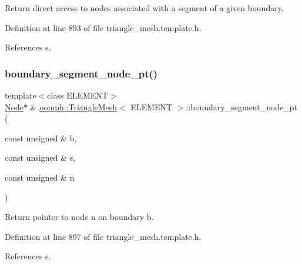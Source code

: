 Return direct access to nodes associated with a segment of a given boundary. 



Definition at line 893 of file triangle\+\_\+mesh.\+template.\+h.



References s.

\mbox{\label{classoomph_1_1TriangleMesh_ad7acd0ef2644130b830eed3cd3a9a259}} 
\subsubsection{\texorpdfstring{boundary\+\_\+segment\+\_\+node\+\_\+pt()}{boundary\_segment\_node\_pt()}\hspace{0.1cm}{\footnotesize\ttfamily [3/3]}}
{\footnotesize\ttfamily template$<$class E\+L\+E\+M\+E\+NT$>$ \\
\hyperlink{classoomph_1_1Node}{Node}$\ast$ \& \hyperlink{classoomph_1_1TriangleMesh}{oomph\+::\+Triangle\+Mesh}$<$ E\+L\+E\+M\+E\+NT $>$\+::boundary\+\_\+segment\+\_\+node\+\_\+pt (\begin{DoxyParamCaption}\item[{const unsigned \&}]{b,  }\item[{const unsigned \&}]{s,  }\item[{const unsigned \&}]{n }\end{DoxyParamCaption})\hspace{0.3cm}{\ttfamily [inline]}}



Return pointer to node n on boundary b. 



Definition at line 897 of file triangle\+\_\+mesh.\+template.\+h.



References s.

\mbox{\label{classoomph_1_1TriangleMesh_a14884948bb2b6e3246efe2a3a5c5f5db}} 
